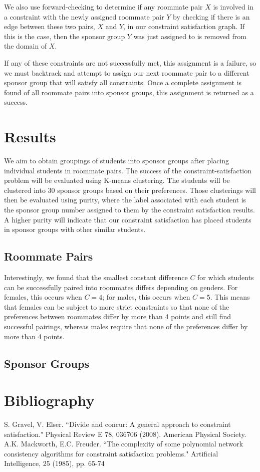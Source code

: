 \documentclass[letterpaper]{article}
\begin{document}
We also use forward-checking to determine if any roommate pair $X$ is involved in a constraint with the newly assigned roommate pair $Y$ by checking if there is an edge between these two pairs, $X$ and $Y$, in our constraint satisfaction graph. If this is the case, then the sponsor group $Y$ was just assigned to is removed from the domain of $X$. 

If any of these constraints are not successfully met, this assignment is a failure, so we must backtrack and attempt to assign our next roommate pair  to a different sponsor group that will satisfy all constraints. Once a complete assignment is found of all roommate pairs into sponsor groups, this assignment is returned as a success.


\section{Results}
We aim to obtain groupings of students into sponsor groups after placing individual students in roommate pairs. 
The success of the constraint-satisfaction problem will be evaluated using K-means clustering. The students will be clustered into 30 sponsor groups based on their preferences. Those clusterings will then be evaluated using purity, where the label associated with each student is the sponsor group number assigned to them by the constraint satisfaction results. A higher purity will indicate that our constraint satisfaction has placed students in sponsor groups with other similar students.

\subsection{Roommate Pairs}
Interestingly, we found that the smallest constant difference $C$ for which students can be successfully paired into roommates differs depending on genders. For females, this occurs when $C = 4$; for males, this occurs when $C=5$. This means that females can be subject to more strict constraints so that none of the preferences between roommates differ by more than 4 points and still find successful pairings, whereas males require that none of the preferences differ by more than 4 points.

\subsection{Sponsor Groups}

\section{Bibliography}

S. Gravel, V. Elser. ``Divide and concur: A general approach to constraint satisfaction." Physical Review E 78, 036706 (2008). American Physical Society.  \\

\noindent A.K. Mackworth, E.C. Freuder. ``The complexity of some polynomial network consistency algorithms for constraint satisfaction problems." Artificial Intelligence, 25 (1985), pp. 65-74
\end{document}
